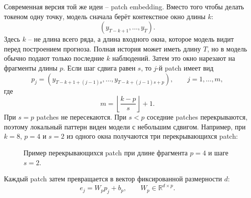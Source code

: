 \documentclass[12pt,fleqn]{article}
\begin{document}
Современная версия той же идеи -- patch embedding.
Вместо того чтобы делать токеном одну точку, модель сначала берёт контекстное окно длины $k$:
\begin{equation}
  (y_{T-k+1}, \ldots, y_T).
\end{equation}
Здесь $k$ -- не длина всего ряда, а длина входного окна, которое модель видит перед построением прогноза.
Полная история может иметь длину $T$, но в модель обычно подают только последние $k$ наблюдений.
Затем это окно нарезают на фрагменты длины $p$.
Если шаг сдвига равен $s$, то $j$-й patch имеет вид
\begin{equation}
  p_j =
  (y_{T-k+1+(j-1)s}, \ldots, y_{T-k+(j-1)s+p}),
  \qquad
  j = 1, \ldots, m,
\end{equation}
где
\begin{equation}
  m = \left\lfloor \frac{k-p}{s} \right\rfloor + 1.
\end{equation}
При $s=p$ patches не пересекаются.
При $s<p$ соседние patches перекрываются, поэтому локальный паттерн виден модели с небольшим сдвигом.
Например, при $k=8$, $p=4$ и $s=2$ из одного окна получаются три перекрывающихся patch:
\begin{figure}[!ht]
\centering
{}
\caption{Пример перекрывающихся patch при длине фрагмента $p=4$ и шаге $s=2$.}
\end{figure}
Каждый patch затем превращается в вектор фиксированной размерности $d$:
\begin{equation}
  e_j = W_p p_j + b_p,
  \qquad
  W_p \in \mathbb{R}^{d \times p}.
\end{equation}
\end{document}
